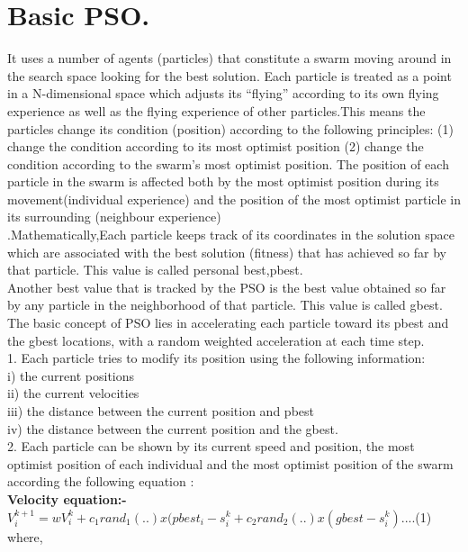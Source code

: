 \section{Basic PSO.}It uses a number of agents (particles) that constitute a swarm moving around in the search space looking for the best solution. Each particle is treated as a point in a N-dimensional space which adjusts its “flying” according to its own flying experience as well as the flying experience of other particles.This means the particles change its condition (position) according to the following principles: (1) change the condition according to its most optimist position (2) change the condition according to the swarm’s most optimist position. The position of each particle in the swarm is affected both by the most optimist position during its movement(individual experience) and the position of the most optimist particle in its surrounding (neighbour experience)\\.Mathematically,Each particle keeps track of its coordinates in the solution space which are associated with the best solution (fitness) that has achieved so far by that particle. This value is called personal best,pbest.\\
Another best value that is tracked by the PSO is the best value obtained so far by any particle in the neighborhood of that particle. This value is called gbest.\\
The basic concept of PSO lies in accelerating each particle toward its pbest and the gbest locations, with a random weighted acceleration at each time step.\\
1. Each particle tries to modify its position using the following information:\\
i) the current positions\\
ii)	the current velocities\\
iii) the distance between the current position and pbest\\
iv) the distance between the current position and the gbest. \\
2. Each particle can be shown by its current speed and position, the most optimist position of each individual and the most optimist position of  the swarm according the following  equation :\\
\textbf{Velocity equation:-}\\  
\textbf{$V_i^{k+1}=wV_i^k+c_1 rand_1(..)x (pbest_i-s_i^k+c_2 rand_2(..)x(gbest-s_i^k)$}....(1) \\
where, \\	
